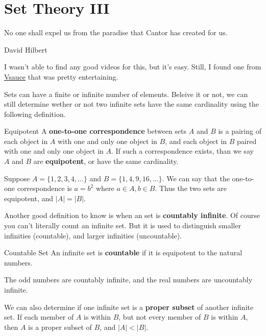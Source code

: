 \chapter{Set Theory III}

\epigraph{No one shall expel us from the paradise that Cantor has created for us.}{David Hilbert}

I wasn't able to find any good videos for this, but it's easy. Still, I found one from \href{https://www.youtube.com/watch?v=SrU9YDoXE88}{Vsauce} that was pretty entertaining.

Sets can have a finite or infinite number of elements. Beleive it or not, we can still determine wether or not two infinite sets have the same cardinality using the following definition.

\begin{boxdefine}{Equipotent}{}
	A {\bf one-to-one correspondence} between sets $A$ and $B$ is a pairing of each object in $A$ with one and only one object in $B$, and each object in $B$ paired with one and only one object in $A$. If such a correspondence exists, than we say $A$ and $B$ are {\bf equipotent}, or have the same cardinality.
\end{boxdefine}

\begin{boxexample}{}{}
	Suppose $A=\{1,2,3,4,\dots\}$ and $B=\{1,4,9,16,\dots\}$. We can say that the one-to-one correspondence is $a=b^2$ where $a \in A, b \in B$. Thus the two sets are equipotent, and $|A|=|B|$.
\end{boxexample}

Another good definition to know is when an set is {\bf countably infinite}. Of course you can't literally count an infinite set. But it is used to distinguish smaller infinities (countable), and larger infinities (uncountable).

\begin{boxdefine}{Countable Set}{}
	An infinite set is {\bf countable} if it is equipotent to the natural numbers. 
\end{boxdefine}

\begin{boxexample}{}{}
	The odd numbers are countably infinite, and the real numbers are uncountably infinite.
\end{boxexample}

We can also determine if one infinite set is a {\bf proper subset} of another infinite set. If each member of $A$ is within $B$, but not every member of $B$ is within $A$, then $A$ is a proper subset of $B$, and $|A| < |B|$.

